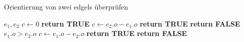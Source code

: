 \begin{algorithm}[ht]
\caption{Orientierung von zwei edgels überprüfen}
\label{alg:compatibleedgel}
\begin{algorithmic}[1]
	\Require $e_1, e_2$
	\State $c \gets 0$
		\State \textbf{return TRUE}
		\State $c \gets e_2.o - e_1.o$
			\State \textbf{return TRUE}
		\Else
			\State \textbf{return FALSE}
		\EndIf
	\Else
		\Comment $e_1.o > e_2.o$
		\State $c \gets e_1.o - e_2.o$
			\State \textbf{return TRUE}
		\Else
			\State \textbf{return FALSE}
		\EndIf
	\EndIf
\end{algorithmic}
\end{algorithm}
